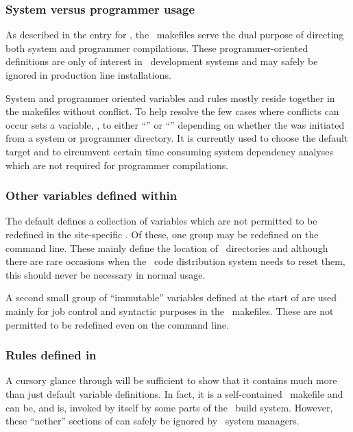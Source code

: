 \subsubsection*{System versus programmer usage}

As described in the entry for , the \aipspp\ makefiles serve
the dual purpose of directing both system and programmer compilations.  These
programmer-oriented definitions are only of interest in \aipspp\ development
systems and may safely be ignored in production line installations.

System and programmer oriented variables and rules mostly reside together in
the makefiles without conflict.  To help resolve the few cases where conflicts
can occur  sets a variable, , to either
``'' or ``'' depending on whether the
 was initiated from a system or programmer directory.  It is
currently used to choose the default target and to circumvent certain time
consuming system dependency analyses which are not required for programmer
compilations.

\subsubsection*{Other variables defined within }

The default  defines a collection of variables which are not
permitted to be redefined in the site-specific .  Of these, one
group may be redefined on the  command line.  These mainly
define the location of \aipspp\ directories and although there are rare
occasions when the \aipspp\ code distribution system needs to reset them, this
should never be necessary in normal usage.

A second small group of ``immutable'' variables defined at the start of
 are used mainly for job control and syntactic purposes in the
\aipspp\ makefiles.  These are not permitted to be redefined even on the
 command line.

\subsubsection*{Rules defined in }

A cursory glance through  will be sufficient to show
that it contains much more than just default variable definitions.  In fact,
it is a self-contained \gnu\ makefile and can be, and is, invoked by itself by
some parts of the \aipspp\ build system.  However, these ``nether'' sections
of  can safely be ignored by \aipspp\ system managers.

